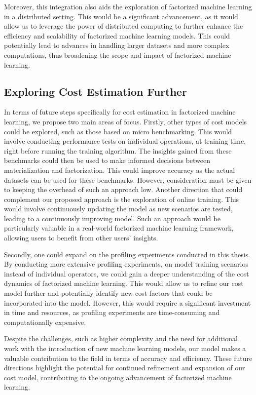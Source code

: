 Moreover, this integration also aids the exploration of factorized machine learning in a distributed setting. This would be a significant advancement, as it would allow us to leverage the power of distributed computing to further enhance the efficiency and scalability of factorized machine learning models. This could potentially lead to advances in handling larger datasets and more complex computations, thus broadening the scope and impact of factorized machine learning.

\subsection{Exploring Cost Estimation Further}
In terms of future steps specifically for cost estimation in factorized machine learning, we propose two main areas of focus. Firstly, other types of cost models could be explored, such as those based on micro benchmarking. This would involve conducting performance tests on individual operations, at training time, right before running the training algorithm. The insights gained from these benchmarks could then be used to make informed decisions between materialization and factorization. This could improve accuracy as the actual datasets can be used for these benchmarks. However, consideration must be given to keeping the overhead of such an approach low. Another direction that could complement our proposed approach is the exploration of online training. This would involve continuously updating the model as new scenarios are tested, leading to a continuously improving model. Such an approach would be particularly valuable in a real-world factorized machine learning framework, allowing users to benefit from other users' insights.

Secondly, one could expand on the profiling experiments conducted in this thesis. By conducting more extensive profiling experiments, on model training scenarios instead of individual operators, we could gain a deeper understanding of the cost dynamics of factorized machine learning. This would allow us to refine our cost model further and potentially identify new cost factors that could be incorporated into the model. However, this would require a significant investment in time and resources, as profiling experiments are time-consuming and computationally expensive.

Despite the challenges, such as higher complexity and the need for additional work with the introduction of new machine learning models, our model makes a valuable contribution to the field in terms of accuracy and efficiency. These future directions highlight the potential for continued refinement and expansion of our cost model, contributing to the ongoing advancement of factorized machine learning.